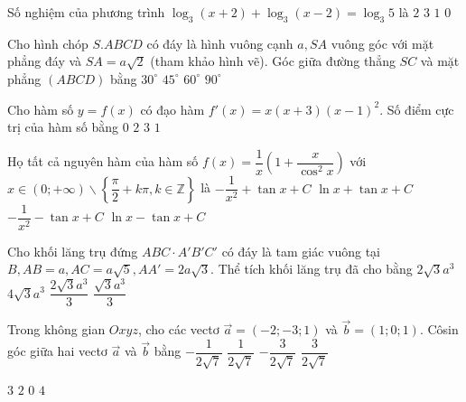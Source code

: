 \begin{ex}%
Số nghiệm của phương trình $\log_3(x+2)+\log_3(x-2)=\log_3 5$ là
\choice
{$2$}
{$3$}
{\True $1$}
{$0$}

\end{ex}
\begin{ex}%
Cho hình chóp $S.ABCD$ có đáy là hình vuông cạnh $a, SA$ vuông góc với mặt phẳng đáy và $SA=a \sqrt{2}$ (tham khảo hình vẽ). Góc giữa đường thẳng $SC$ và mặt phẳng $(ABCD)$ bằng
\choice
{$30^{\circ}$}
{\True $45^{\circ}$}
{$60^{\circ}$}
{$90^{\circ}$}

\end{ex}
\begin{ex}%
Cho hàm số $y=f(x)$ có đạo hàm $f'(x)=x(x+3)(x-1)^2$. Số điểm cực trị của hàm số bằng
\choice
{$0$}
{\True $2$}
{$3$}
{$1$}

\end{ex}
\begin{ex}%
Họ tất cả nguyên hàm của hàm số $f(x)=\dfrac{1}{x}\left(1+\dfrac{x}{\cos ^2 x}\right)$ với $x \in(0;+\infty) \backslash\left\{\dfrac{\pi}{2}+k \pi, k \in \mathbb{Z}\right\}$ là
\choice
{$-\dfrac{1}{x^2}+\tan x+C$}
{\True $\ln x+\tan x+C$}
{$-\dfrac{1}{x^2}-\tan x+C$}
{$\ln x-\tan x+C$}

\end{ex}
\begin{ex}%
Cho khối lăng trụ đứng $ABC \cdot A'B'C'$ có đáy là tam giác vuông tại $B, AB=a, AC=a \sqrt{5}, AA'=2 a \sqrt{3}$. Thể tích khối lăng trụ đã cho bằng
\choice
{\True $2\sqrt{3} a^3$}
{$4\sqrt{3} a^3$}
{$\dfrac{2\sqrt{3} a^3}{3}$}
{$\dfrac{\sqrt{3} a^3}{3}$}

\end{ex}
\begin{ex}%
Trong không gian $O x y z$, cho các vectơ $\vec{a}=(-2;-3; 1)$ và $\vec{b}=  (1; 0; 1)$. Côsin góc giữa hai vectơ $\vec{a}$ và $\vec{b}$ bằng
\choice
{\True $-\dfrac{1}{2\sqrt{7}}$}
{$\dfrac{1}{2\sqrt{7}}$}
{$-\dfrac{3}{2\sqrt{7}}$}
{$\dfrac{3}{2\sqrt{7}}$}

\end{ex}
\begin{ex}%
{
}
\choice
{$3$}
{\True $2$}
{$0$}
{$4$}
\end{ex}
